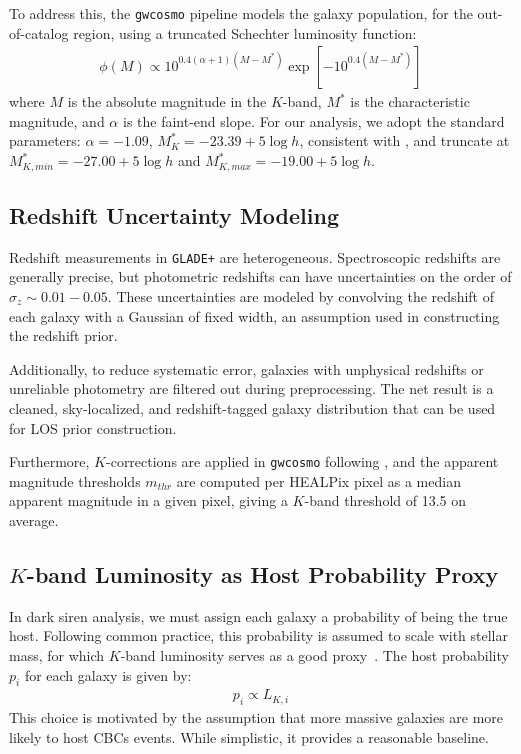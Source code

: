 To address this, the \texttt{gwcosmo} pipeline models the galaxy population, for the out-of-catalog region, using a truncated Schechter luminosity function:
\begin{align}
    \phi(M) \propto 10^{0.4(\alpha + 1)(M - M^*)} \exp[-10^{0.4(M - M^*)}]
\end{align}
where \( M \) is the absolute magnitude in the $K$-band, $M^*$ is the characteristic magnitude, and $\alpha$ is the faint-end slope. For our analysis, we adopt the standard parameters: $\alpha = -1.09$, $M^*_K = -23.39 + 5\log h$, consistent with \citet{kochanek2001k}, and truncate at $M^*_{K,min} = -27.00 + 5\log h$ and $M^*_{K,max} = -19.00 + 5\log h$.

\subsection{Redshift Uncertainty Modeling}

Redshift measurements in \texttt{GLADE+} are heterogeneous. Spectroscopic redshifts are generally precise, but photometric redshifts can have uncertainties on the order of $\sigma_z \sim 0.01-0.05$. These uncertainties are modeled by convolving the redshift of each galaxy with a Gaussian of fixed width, an assumption used in constructing the redshift prior.

Additionally, to reduce systematic error, galaxies with unphysical redshifts or unreliable photometry are filtered out during preprocessing. The net result is a cleaned, sky-localized, and redshift-tagged galaxy distribution that can be used for \ac{LOS} prior construction.

Furthermore, $K$-corrections are applied in \texttt{gwcosmo} following \citet{kochanek2001k}, and the apparent magnitude thresholds $m_{thr}$ are computed per HEALPix pixel as a median apparent magnitude in a given pixel, giving a $K$-band threshold of 13.5 on average.

\subsection{$K$-band Luminosity as Host Probability Proxy}

In dark siren analysis, we must assign each galaxy a probability of being the true host. Following common practice, this probability is assumed to scale with stellar mass, for which $K$-band luminosity serves as a good proxy~\citep{strazzullo2006near,sureshkumar2021galaxy}. The host probability  $p_i$ for each galaxy is given by:
\begin{align}
    p_i \propto L_{K, i}
\end{align}
This choice is motivated by the assumption that more massive galaxies are more likely to host \acp{CBC} events. While simplistic, it provides a reasonable baseline.